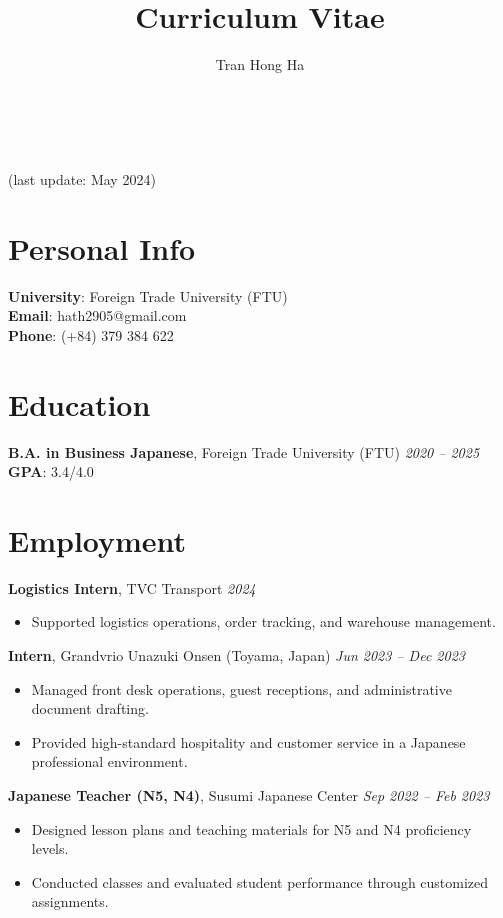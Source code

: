 \documentclass[12pt]{article}
\newcommand{\cvcolor}{\color{DodgerBlue4}} %
\renewcommand{\maketitle}{
\begin{center}
{\Huge\theauthor}\\
\vspace{0.5em}
{\Large \cvcolor{Curriculum Vitae}}\\
{\color{Gray}(last update: May 2024)}
\end{center}
}
\begin{document}
\title{Curriculum Vitae} %
\author{Tran Hong Ha}

\maketitle


\section{Personal Info}
\textbf{University}: Foreign Trade University (FTU) \\
\textbf{Email}: hath2905@gmail.com \\
\textbf{Phone}: (+84) 379 384 622 \\

\section{Education}
\textbf{B.A. in Business Japanese}, Foreign Trade University (FTU) \hfill \emph{2020 -- 2025}\\
\textbf{GPA}: 3.4/4.0

\section{Employment}
\textbf{Logistics Intern}, TVC Transport \hfill \emph{2024}\\
\begin{itemize}[leftmargin=*]
  \item Supported logistics operations, order tracking, and warehouse management.
\end{itemize}

\textbf{Intern}, Grandvrio Unazuki Onsen (Toyama, Japan) \hfill \emph{Jun 2023 -- Dec 2023}\\
\begin{itemize}[leftmargin=*]
  \item Managed front desk operations, guest receptions, and administrative document drafting.
  \item Provided high-standard hospitality and customer service in a Japanese professional environment.
\end{itemize}

\textbf{Japanese Teacher (N5, N4)}, Susumi Japanese Center \hfill \emph{Sep 2022 -- Feb 2023}\\
\begin{itemize}[leftmargin=*]
  \item Designed lesson plans and teaching materials for N5 and N4 proficiency levels.
  \item Conducted classes and evaluated student performance through customized assignments.
\end{itemize}
\end{document}
